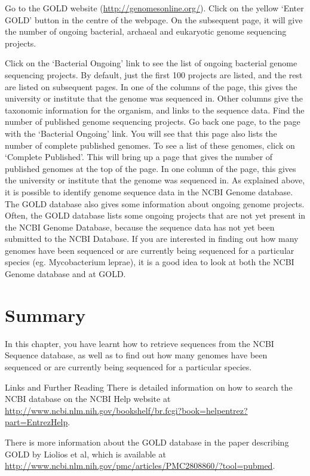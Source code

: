 \documentclass[
]{book}
\begin{document}
Go to the GOLD website (\url{http://genomesonline.org/}).
Click on the yellow `Enter GOLD' button in the centre of the webpage. On the subsequent page, it will give the number of ongoing bacterial, archaeal and eukaryotic genome sequencing projects.

Click on the `Bacterial Ongoing' link to see the list of ongoing bacterial genome sequencing projects. By default, just the first 100 projects are listed, and the rest are listed on subsequent pages. In one of the columns of the page, this gives the university or institute that the genome was sequenced in. Other columns give the taxonomic information for the organism, and links to the sequence data.
Find the number of published genome sequencing projects. Go back one page, to the page with the `Bacterial Ongoing' link. You will see that this page also lists the number of complete published genomes. To see a list of these genomes, click on `Complete Published'. This will bring up a page that gives the number of published genomes at the top of the page. In one column of the page, this gives the university or institute that the genome was sequenced in.
As explained above, it is possible to identify genome sequence data in the NCBI Genome database. The GOLD database also gives some information about ongoing genome projects. Often, the GOLD database lists some ongoing projects that are not yet present in the NCBI Genome Database, because the sequence data has not yet been submitted to the NCBI Database. If you are interested in finding out how many genomes have been sequenced or are currently being sequenced for a particular species (eg. Mycobacterium leprae), it is a good idea to look at both the NCBI Genome database and at GOLD.

\hypertarget{summary-1}{%
\section{Summary}\label{summary-1}}

In this chapter, you have learnt how to retrieve sequences from the NCBI Sequence database, as well as to find out how many genomes have been sequenced or are currently being sequenced for a particular species.

Links and Further Reading
There is detailed information on how to search the NCBI database on the NCBI Help website at \url{http://www.ncbi.nlm.nih.gov/bookshelf/br.fcgi?book=helpentrez?part=EntrezHelp}.

There is more information about the GOLD database in the paper describing GOLD by Liolios et al, which is available at \url{http://www.ncbi.nlm.nih.gov/pmc/articles/PMC2808860/?tool=pubmed}.
\end{document}
